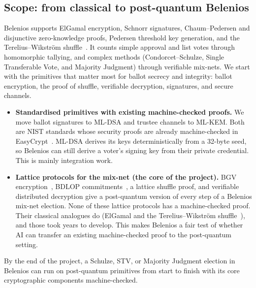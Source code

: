 \documentclass[11pt]{article}
\begin{document}
\subsection{Scope: from classical to post-quantum Belenios}
Belenios supports ElGamal encryption, Schnorr signatures, Chaum--Pedersen and disjunctive zero-knowledge proofs,
Pedersen threshold key generation, and the Terelius--Wikstr\"om shuffle~\cite{terelius2010restricted}. It counts
simple approval and list votes through homomorphic tallying, and complex methods (Condorcet--Schulze, Single
Transferable Vote, and Majority Judgment) through verifiable mix-nets. We start with the primitives that matter most
for ballot secrecy and integrity: ballot encryption, the proof of shuffle, verifiable decryption, signatures, and
secure channels.
\begin{itemize}
\item \textbf{Standardised primitives with existing machine-checked proofs.} We move ballot signatures to ML-DSA
and trustee channels to ML-KEM. Both are NIST standards whose security proofs are already machine-checked in
EasyCrypt~\cite{barbosa2023dilithium,almeida2024mlkem}. ML-DSA derives its keys deterministically from a 32-byte
seed, so Belenios can still derive a voter's signing key from their private credential. This is mainly integration work.
\item \textbf{Lattice protocols for the mix-net (the core of the project).} BGV encryption~\cite{bgv2012}, BDLOP
commitments~\cite{baum2018bdlop}, a lattice shuffle proof, and verifiable distributed decryption give a post-quantum
version of every step of a Belenios mix-net election. None of these lattice protocols has a machine-checked proof.
Their classical analogues do (ElGamal and the Terelius--Wikstr\"om
shuffle~\cite{cortier2018belenioseasycrypt,haines2019verified,287095}), and those took years to develop. This makes
Belenios a fair test of whether AI can transfer an existing machine-checked proof to the post-quantum setting.
\end{itemize}
By the end of the project, a Schulze, STV, or Majority Judgment election in Belenios can run on post-quantum primitives
from start to finish with its core cryptographic components machine-checked.
\end{document}
